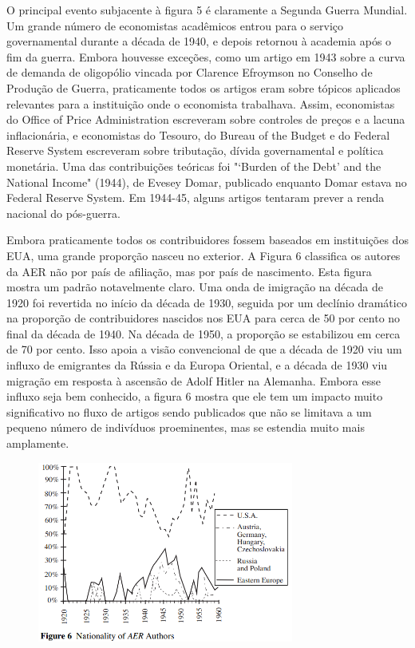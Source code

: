 \documentclass[12pt]{article}
\begin{document}
O principal evento subjacente à figura 5 é claramente a Segunda Guerra Mundial. Um grande número de economistas acadêmicos entrou para o serviço governamental durante a década de 1940, e depois retornou à academia após o fim da guerra. Embora houvesse exceções, como um artigo em 1943 sobre a curva de demanda de oligopólio vincada por Clarence Efroymson no Conselho de Produção de Guerra, praticamente todos os artigos eram sobre tópicos aplicados relevantes para a instituição onde o economista trabalhava. Assim, economistas do Office of Price Administration escreveram sobre controles de preços e a lacuna inflacionária, e economistas do Tesouro, do Bureau of the Budget e do Federal Reserve System escreveram sobre tributação, dívida governamental e política monetária. Uma das contribuições teóricas foi "‘Burden of the Debt’ and the National Income" (1944), de Evesey Domar, publicado enquanto Domar estava no Federal Reserve System. Em 1944-45, alguns artigos tentaram prever a renda nacional do pós-guerra.

Embora praticamente todos os contribuidores fossem baseados em instituições dos EUA, uma grande proporção nasceu no exterior. A Figura 6 classifica os autores da AER não por país de afiliação, mas por país de nascimento. Esta figura mostra um padrão notavelmente claro. Uma onda de imigração na década de 1920 foi revertida no início da década de 1930, seguida por um declínio dramático na proporção de contribuidores nascidos nos EUA para cerca de 50 por cento no final da década de 1940. Na década de 1950, a proporção se estabilizou em cerca de 70 por cento. Isso apoia a visão convencional de que a década de 1920 viu um influxo de emigrantes da Rússia e da Europa Oriental, e a década de 1930 viu migração em resposta à ascensão de Adolf Hitler na Alemanha. Embora esse influxo seja bem conhecido, a figura 6 mostra que ele tem um impacto muito significativo no fluxo de artigos sendo publicados que não se limitava a um pequeno número de indivíduos proeminentes, mas se estendia muito mais amplamente.

\begin{figure}[H]
    \centering
    \includegraphics[width=0.75\textwidth]{4º Período/História do Pensamento Econômico/Tradução HPE/Tradução Tópico 7.2/figure 6.png}
    \end{figure}
\end{document}
